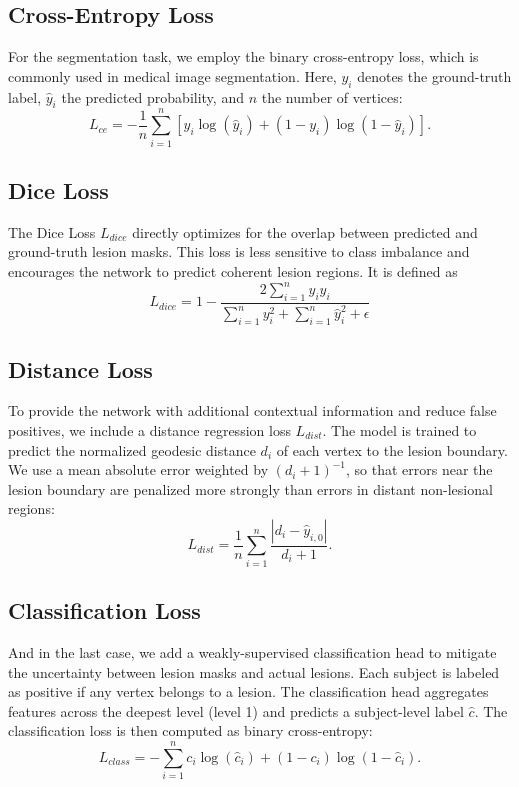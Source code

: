 \documentclass[FCD_GNN.tex]{subfiles}
\begin{document}
\subsection{Cross-Entropy Loss}
For the segmentation task, we employ the binary cross-entropy loss, which is commonly used in medical image segmentation. Here, $y_i$ denotes the ground-truth label, $\hat{y}_i$ the predicted probability, and $n$ the number of vertices:
\[
L_{ce} = - \frac{1}{n} \sum_{i=1}^{n} 
\left[ y_i \log(\hat{y}_i) + (1-y_i)\log(1-\hat{y}_i) \right].
\]


\subsection{Dice Loss}
The Dice Loss $L_{dice}$ directly optimizes for the overlap between predicted and ground-truth lesion masks. This loss is less sensitive to class imbalance and encourages the network to predict coherent lesion regions. It is defined as
\[
L_{dice} = 1 - \frac{2 \sum_{i=1}^n y_i \hat{y}_i}{\sum_{i=1}^n y_i^2 + \sum_{i=1}^n \hat{y}_i^2 + \epsilon}
\]

\subsection{Distance Loss}
To provide the network with additional contextual information and reduce false positives, we include a distance regression loss $L_{dist}$. The model is trained to predict the normalized geodesic distance $d_i$ of each vertex to the lesion boundary. We use a mean absolute error weighted by $(d_i+1)^{-1}$, so that errors near the lesion boundary are penalized more strongly than errors in distant non-lesional regions:
\[
L_{dist} = \frac{1}{n} \sum_{i=1}^{n} \frac{|d_i - \hat{y}_{i,0}|}{d_i + 1}.
\]

\subsection{Classification Loss}
And in the last case, we add a weakly-supervised classification head to mitigate the uncertainty between lesion masks and actual lesions. Each subject is labeled as positive if any vertex belongs to a lesion. The classification head aggregates features across the deepest level (level 1) and predicts a subject-level label $\hat{c}$. The classification loss is then computed as binary cross-entropy:
\[
L_{class} = - \sum_{i=1}^{n} c_i \log(\hat{c}_i) + (1-c_i)\log(1-\hat{c}_i).
\]
\end{document}
